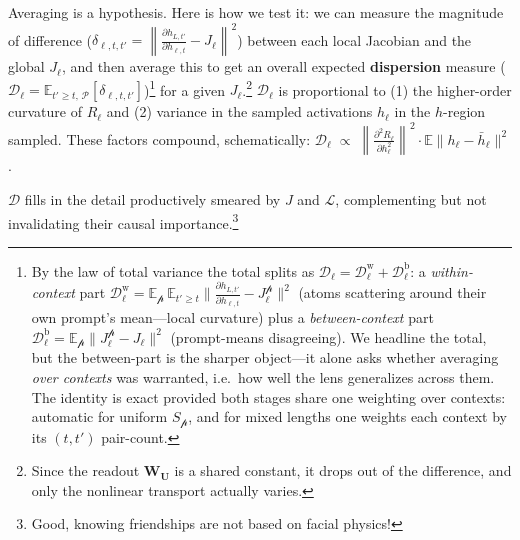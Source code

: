 \documentclass{article}
\newcommand{\jlens}{\mathscr{L}}
\newcommand{\dispersion}{\mathscr{D}}
\begin{document}
Averaging is a hypothesis. Here is how we test it: we can measure the magnitude of difference (\(\delta_{\ell,t,t'} = \left\|\frac{\partial h_{L,t'}}{\partial h_{\ell,t}} - J_\ell\right\|^2\)) between each local Jacobian and the global \(J_\ell\), and then average this to get an overall expected \textbf{dispersion} measure (\(\dispersion_\ell = \mathbb{E}_{t' \ge t,\, \mathscr{P}}[\delta_{\ell,t,t'}]\))\footnote{By the law of total variance the total splits as \(\dispersion_\ell = \dispersion^{\mathrm{w}}_\ell + \dispersion^{\mathrm{b}}_\ell\): a \textit{within-context} part \(\dispersion^{\mathrm{w}}_\ell = \mathbb{E}_{\mathscr{p}}\,\mathbb{E}_{t'\ge t}\bigl\lVert\frac{\partial h_{L,t'}}{\partial h_{\ell,t}} - J^{\mathscr{p}}_\ell\bigr\rVert^2\) (atoms scattering around their own prompt's mean---local curvature) plus a \textit{between-context} part \(\dispersion^{\mathrm{b}}_\ell = \mathbb{E}_{\mathscr{p}}\bigl\lVert J^{\mathscr{p}}_\ell - J_\ell\bigr\rVert^2\) (prompt-means disagreeing). We headline the total, but the between-part is the sharper object---it alone asks whether averaging \textit{over contexts} was warranted, i.e.\ how well the lens generalizes across them. The identity is exact provided both stages share one weighting over contexts: automatic for uniform \(S_{\mathscr{p}}\), and for mixed lengths one weights each context by its \((t,t')\) pair-count.} for a given \(J_\ell\).\footnote{Since the readout \(\mathbf{W_U}\) is a shared constant, it drops out of the difference, and only the nonlinear transport actually varies.} \(\dispersion_\ell\) is proportional to (1) the higher-order curvature of \(R_{\ell}\) and (2) variance in the sampled activations \(h_\ell\) in the \(h\)-region sampled. These factors compound, schematically: \(\dispersion_\ell \;\propto\; \left\|\frac{\partial^2 R_\ell}{\partial h_\ell^2}\right\|^2 \cdot \mathbb{E}\|h_\ell-\bar h_\ell\|^2\).


\(\dispersion\) fills in the detail productively smeared by \(J\) and \(\jlens\), complementing but not invalidating their causal importance.\footnote{Good, knowing friendships are not based on facial physics!}
\end{document}
